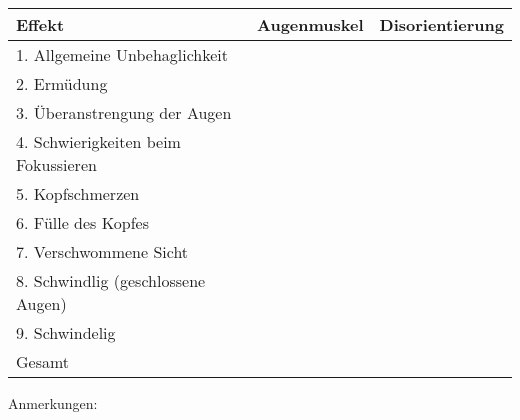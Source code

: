 \documentclass[a4paper,10pt,BCOR10mm,oneside,headsepline]{scrartcl}
\newcommand{\Qline}[1]{\noindent\rule{#1}{0.6pt}}
\newcounter{ql}
\newcommand{\Qlines}[1]{\forloop{ql}{0}{\value{ql}<#1}{\vskip0.5em\Qline{\linewidth}}}
\begin{document}
	\begin{center}
		\begin{tabular}{| l | c | c |}
			\hline
			Effekt & Augenmuskel & Disorientierung\\
			\hline
			1. Allgemeine Unbehaglichkeit & &\\
			\hline
			2. Erm\"udung & & \\
			\hline
			3. \"Uberanstrengung der Augen &  &\\
			\hline
			4. Schwierigkeiten beim Fokussieren & & \\
			\hline
			5. Kopfschmerzen & &  \\
			\hline
			6. F\"ulle des Kopfes & &  \\
			\hline
			7. Verschwommene Sicht & &  \\
			\hline
			8. Schwindlig (geschlossene Augen) & & \\
			\hline
			9. Schwindelig &  &\\
			\hline
			\hline
			Gesamt &  & \\
			\hline
		\end{tabular}
	\end{center} \vspace{1cm} 
	Anmerkungen:
	\Qlines{6}
\end{document}
